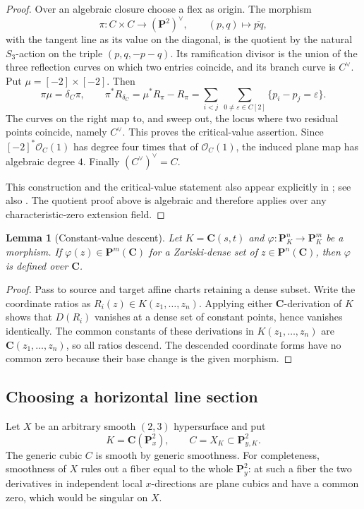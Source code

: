 \documentclass[11pt]{amsart}
\newtheorem{lemma}[theorem]{Lemma}
\theoremstyle{definition}
\theoremstyle{remark}
\newcommand{\PP}{\mathbf{P}}
\newcommand{\CC}{\mathbf{C}}
\begin{document}
\begin{proof}
Over an algebraic closure choose a flex as origin.  The morphism
\[
\pi:C\times C\longrightarrow(\PP^2)^\vee,
\qquad(p,q)\longmapsto\overline{pq},
\]
with the tangent line as its value on the diagonal, is the quotient by the
natural $S_3$-action on the triple $(p,q,-p-q)$.  Its ramification divisor
is the union of the three reflection curves on which two entries coincide,
and its branch curve is $C^\vee$.  Put $\mu=[-2]\times[-2]$.  Then
\[
\pi\mu=\delta_C\pi,
\qquad
\pi^*R_{\delta_C}=\mu^*R_\pi-R_\pi
=\sum_{i<j}\ \sum_{0\ne\varepsilon\in C[2]}
\{p_i-p_j=\varepsilon\}.
\tag{4.2}
\]
The curves on the right map to, and sweep out, the locus where two residual
points coincide, namely $C^\vee$.  This proves the critical-value assertion.
Since $[-2]^*\mathcal O_C(1)$ has degree four times that of
$\mathcal O_C(1)$, the induced plane map has algebraic degree $4$.
Finally $(C^\vee)^\vee=C$.

This construction and the critical-value statement also appear explicitly
in \cite[p.~964, (2.6)]{MMW}; see also \cite[\S4.3]{DabijaJonsson}.
The quotient proof above is algebraic and therefore applies over any
characteristic-zero extension field.
\end{proof}

\begin{lemma}[Constant-value descent]\label{lem:constant-descent}
Let $K=\CC(s,t)$ and
$\varphi:\PP^n_K\to\PP^m_K$ be a morphism.  If
$\varphi(z)\in\PP^m(\CC)$ for a Zariski-dense set of
$z\in\PP^n(\CC)$, then $\varphi$ is defined over $\CC$.
\end{lemma}

\begin{proof}
Pass to source and target affine charts retaining a dense subset.  Write the
coordinate ratios as $R_i(z)\in K(z_1,\ldots,z_n)$.  Applying either
$\CC$-derivation of $K$ shows that $D(R_i)$ vanishes at a dense set of
constant points, hence vanishes identically.  The common constants of these
derivations in $K(z_1,\ldots,z_n)$ are
$\CC(z_1,\ldots,z_n)$, so all ratios descend.  The descended coordinate
forms have no common zero because their base change is the given morphism.
\end{proof}

\subsection{Choosing a horizontal line section}

Let $X$ be an arbitrary smooth $(2,3)$ hypersurface and put
\[
K=\CC(\PP^2_x),\qquad C=X_K\subset\PP^2_{y,K}.
\]
The generic cubic $C$ is smooth by generic smoothness.  For completeness,
smoothness of $X$ rules out a fiber equal to the whole $\PP^2_y$: at such a
fiber the two derivatives in independent local $x$-directions are plane
cubics and have a common zero, which would be singular on $X$.
\end{document}
